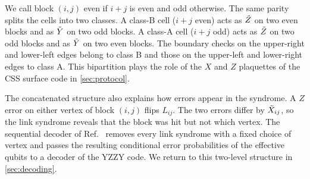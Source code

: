 We call block $(i,j)$ even if $i+j$ is even and odd otherwise. The same parity splits the cells into two classes. A class-B cell ($i+j$ even) acts as $\tilde{Z}$ on two even blocks and as $\tilde{Y}$ on two odd blocks. A class-A cell ($i+j$ odd) acts as $\tilde{Z}$ on two odd blocks and as $\tilde{Y}$ on two even blocks. The boundary checks on the upper-right and lower-left edges belong to class B and those on the upper-left and lower-right edges to class A. This bipartition plays the role of the $X$ and $Z$ plaquettes of the CSS surface code in \autoref{sec:protocol}.

The concatenated structure also explains how errors appear in the syndrome. A $Z$ error on either vertex of block $(i,j)$ flips $L_{ij}$. The two errors differ by $\tilde{X}_{ij}$, so the link syndrome reveals that the block was hit but not which vertex. The sequential decoder of Ref.~\cite{Sri2025} removes every link syndrome with a fixed choice of vertex and passes the resulting conditional error probabilities of the effective qubits to a decoder of the YZZY code. We return to this two-level structure in \autoref{sec:decoding}.
